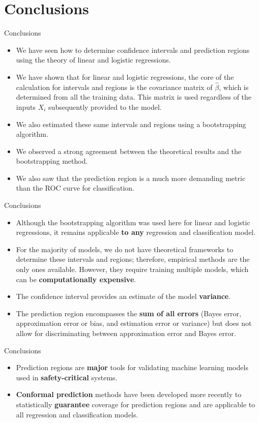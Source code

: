 \section[Conclusions]{Conclusions}

\begin{frame}{Conclusions}
	\begin{itemize}
		\item We have seen how to determine confidence intervals and prediction regions using the theory of linear and logistic regressions.
		\pause
		\item We have shown that for linear and logistic regressions, the core of the calculation for intervals and regions is the covariance matrix of $\hat{\beta}$, which is determined from all the training data. This matrix is used regardless of the inputs $X_i$ subsequently provided to the model.
		\pause
		\item We also estimated these same intervals and regions using a bootstrapping algorithm.
		\pause
		\item We observed a strong agreement between the theoretical results and the bootstrapping method.
		\pause
		\item We also saw that the prediction region is a much more demanding metric than the ROC curve for classification.
	\end{itemize}
\end{frame}

\begin{frame}{Conclusions}
	\begin{itemize}
		\item Although the bootstrapping algorithm was used here for linear and logistic regressions, it remains applicable \textbf{to any} regression and classification model.
		\pause
		\item For the majority of models, we do not have theoretical frameworks to determine these intervals and regions; therefore, empirical methods are the only ones available. However, they require training multiple models, which can be \textbf{computationally expensive}.
		\pause
		\item The confidence interval provides an estimate of the model \textbf{variance}.
		\pause
		\item The prediction region encompasses the \textbf{sum of all errors} (Bayes error, approximation error or bias, and estimation error or variance) but does not allow for discriminating between approximation error and Bayes error.
	\end{itemize}
\end{frame}

\begin{frame}{Conclusions}
	\begin{itemize}
		\item Prediction regions are \textbf{major} tools for validating machine learning models used in \textbf{safety-critical} systems.
		\pause
		\item \textbf{Conformal prediction} methods have been developed more recently to statistically \textbf{guarantee} coverage for prediction regions and are applicable to all regression and classification models.
	\end{itemize}
\end{frame}
